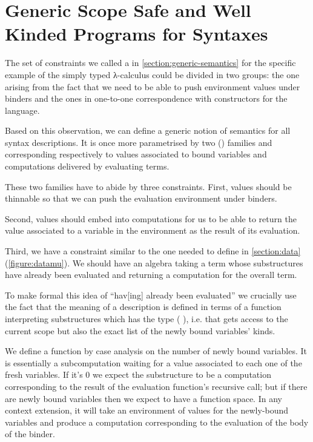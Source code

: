 \chapter{Generic Scope Safe and Well Kinded Programs for Syntaxes}\label{chapter:generic-semantics}

The set of constraints we called a  in
\cref{section:generic-semantics} for the specific example of the
simply typed λ-calculus could be divided in two groups: the one
arising from the fact that we need to be able to push environment
values under binders and the ones in one-to-one correspondence
with constructors for the language.

Based on this observation, we can define a generic notion of semantics
for all syntax descriptions. It is once more parametrised by two
{()} families  and  corresponding
respectively to values associated to bound variables and computations
delivered by evaluating terms.


These two families have to abide by three constraints. First, values
should be thinnable so that we can push the evaluation environment
under binders.


Second, values should embed into computations for us to be able to
return the value associated to a variable in the environment as the
result of its evaluation.


Third, we have a constraint similar to the one needed to define  in
\cref{section:data} (\cref{figure:datamu}). We should have an algebra taking
a term whose substructures have already been evaluated and returning a
computation for the overall term.


To make formal this idea of ``hav[ing] already been evaluated'' we crucially use
the fact that the meaning of a description is defined in terms of a function
interpreting substructures which has the type (   ),
i.e. that gets access to the current scope but also the exact list of the newly
bound variables' kinds.

We define a function  by case analysis on the number of newly bound
variables. It is essentially a subcomputation waiting for a value associated to
each one of the fresh variables. If it's $0$ we expect the substructure to be a
computation corresponding to the result of the evaluation function's recursive
call; but if there are newly bound variables then we expect to have a function
space. In any context extension, it will take an environment of values for the
newly-bound variables and produce a computation corresponding to the evaluation
of the body of the binder.

